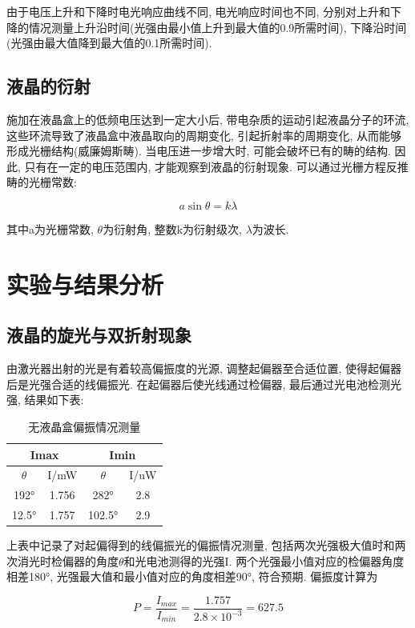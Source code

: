\documentclass[12pt,a4paper]{article}
\newcommand{\be}[1]{
    \begin{equation}
        #1
    \end{equation}
}
\begin{document}
由于电压上升和下降时电光响应曲线不同, 电光响应时间也不同, 分别对上升和下降的情况测量上升沿时间(光强由最小值上升到最大值的0.9所需时间), 下降沿时间(光强由最大值降到最大值的0.1所需时间).

\subsection{液晶的衍射}
施加在液晶盒上的低频电压达到一定大小后, 带电杂质的运动引起液晶分子的环流, 这些环流导致了液晶盒中液晶取向的周期变化, 引起折射率的周期变化, 从而能够形成光栅结构(威廉姆斯畴). 当电压进一步增大时, 可能会破坏已有的畴的结构. 因此, 只有在一定的电压范围内, 
才能观察到液晶的衍射现象. 可以通过光栅方程反推畴的光栅常数: 
\be{a\sin{\theta}=k\lambda}
其中a为光栅常数, $\theta$为衍射角, 整数k为衍射级次, $\lambda$为波长. 
\section{实验与结果分析}
\subsection{液晶的旋光与双折射现象}
由激光器出射的光是有着较高偏振度的光源, 调整起偏器至合适位置, 使得起偏器后是光强合适的线偏振光. 
在起偏器后使光线通过检偏器, 最后通过光电池检测光强, 结果如下表: 
\begin{table}[H]
    \centering
    \begin{tabular}{|cc|cc|}
    \hline
    \multicolumn{2}{|c|}{Imax}          & \multicolumn{2}{c|}{Imin}         \\ \hline
    \multicolumn{1}{|c|}{$\theta$} & I/mW   & \multicolumn{1}{c|}{$\theta$}  & I/uW \\ \hline
    \multicolumn{1}{|c|}{192°}  & 1.756 & \multicolumn{1}{c|}{282°}   & 2.8 \\ \hline
    \multicolumn{1}{|c|}{12.5°} & 1.757 & \multicolumn{1}{c|}{102.5°} & 2.9 \\ \hline
    \end{tabular}
    \caption{无液晶盒偏振情况测量}
    \end{table}
上表中记录了对起偏得到的线偏振光的偏振情况测量, 包括两次光强极大值时和两次消光时检偏器的角度$\theta$和光电池测得的光强I. 
两个光强最小值对应的检偏器角度相差180°, 光强最大值和最小值对应的角度相差90°, 符合预期. 偏振度计算为
\be{P=\frac{I_{max}}{I_{min}}=\frac{1.757}{2.8\times 10^{-3}}=627.5}
\end{document}
